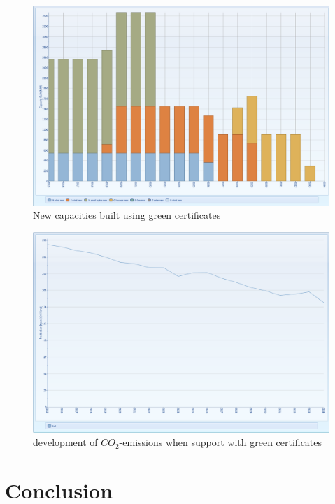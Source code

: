 \documentclass{article}
\begin{document}
\begin{figure}[htbp]
\begin{center}
\includegraphics[width=13cm,keepaspectratio=true]{figures/Expansion/GreenCertificate/CapacityBuiltNewGenGC}
\caption{New capacities built using green certificates}
\label{fig:CapacityBuiltNewGenGC}
\end{center}
\end{figure}
\begin{figure}[htbp]
\begin{center}
\includegraphics[width=13cm,keepaspectratio=true]{figures/Expansion/GreenCertificate/Co2ProductionGC}
\caption{development of $CO_2$-emissions when support with green certificates}
\label{fig:Co2ProductionGC}
\end{center}
\end{figure}



\newpage
\section{Conclusion}
\end{document}
